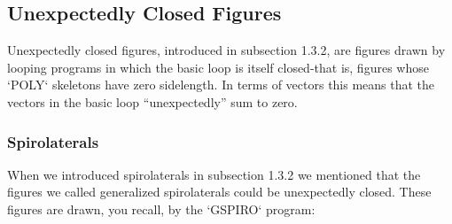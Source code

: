 \documentclass{book}
\begin{document}
\subsection{Unexpectedly Closed Figures}

Unexpectedly closed figures, introduced in subsection 1.3.2, are figures
drawn by looping programs in which the basic loop is itself closed-that
is, figures whose \textsc{`POLY`} skeletons have zero sidelength. In terms of vectors
this means that the vectors in the basic loop ``unexpectedly'' sum to zero.


\subsubsection{Spirolaterals}

When we introduced spirolaterals in subsection 1.3.2 we mentioned that
the figures we called generalized spirolaterals could be unexpectedly
closed. These figures are drawn, you recall, by the \textsc{`GSPIRO`} program:
\end{document}
